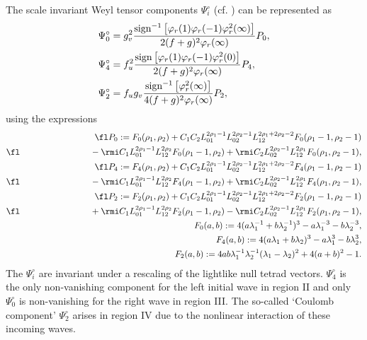 \documentclass[12pt]{iopart}
\begin{document}
The scale invariant Weyl tensor components $\Psi_i^{\circ}$ (cf. \cite{Griffiths1991}) can be represented as
\begin{eqnarray}
\Psi_0^{\circ}&=g_v^2\frac{{\rm sign}^{-1}\left[\varphi_r(1)\varphi_r(-1)\varphi_r^2(\infty)\right]}
   {2(f+g)^2\varphi_r(\infty)}P_0, \\
\Psi_4^{\circ}&=f_u^2\frac{{\rm sign}\left[\varphi_r(1)\varphi_r(-1)\varphi_r^2(0)\right]}
   {2(f+g)^2\varphi_r(\infty)}P_4, \\
\Psi_2^{\circ}&=f_ug_v\frac{{\rm sign}^{-1}\left[\varphi_r^2(\infty)\right]}
   {4(f+g)^2\varphi_r(\infty)}P_2,
\end{eqnarray}
using the expressions 
\begin{eqnarray}
\fl P_0:=F_0(\rho_1,\rho_2)+C_1 C_2 L_{01}^{2 \rho_1-1} L_{02}^{2 \rho_2-1} L_{12}^{2 \rho_1+2\rho_2-2} F_0(\rho_1-1,\rho_2-1)\\
\fl   \qquad\qquad\qquad\qquad -\rmi C_1 L_{01}^{2 \rho_1-1} L_{12}^{2
   \rho_2} F_0(\rho_1-1,\rho_2)+\rmi C_2 L_{02}^{2 \rho_2-1} L_{12}^{2
   \rho_1} F_0(\rho_1,\rho_2-1), \nonumber\\
\fl P_4:=F_4(\rho_1,\rho_2)+C_1 C_2 L_{01}^{2 \rho_1-1} L_{02}^{2 \rho_2-1} L_{12}^{2 \rho_1+2\rho_2-2} F_4(\rho_1-1,\rho_2-1)\\
\fl   \qquad\qquad\qquad\qquad -\rmi C_1 L_{01}^{2 \rho_1-1} L_{12}^{2
   \rho_2} F_4(\rho_1-1,\rho_2)+\rmi C_2 L_{02}^{2 \rho_2-1} L_{12}^{2
   \rho_1} F_4(\rho_1,\rho_2-1), \nonumber\\
\fl P_2:=F_2(\rho_1,\rho_2)+C_1 C_2 L_{01}^{2 \rho_1-1} L_{02}^{2 \rho_2-1} L_{12}^{2 \rho_1+2\rho_2-2} F_2(\rho_1-1,\rho_2-1)\\
\fl   \qquad\qquad\qquad\qquad +\rmi C_1 L_{01}^{2 \rho_1-1} L_{12}^{2
   \rho_2} F_2(\rho_1-1,\rho_2)-\rmi C_2 L_{02}^{2 \rho_2-1} L_{12}^{2
   \rho_1} F_2(\rho_1,\rho_2-1), \nonumber\\
F_0(a,b):=4(a\lambda_1^{-1}+b\lambda_2^{-1})^3-a\lambda_1^{-3}-b\lambda_2^{-3}, \\
F_4(a,b):=4(a\lambda_1+b\lambda_2)^3-a\lambda_1^{3}-b\lambda_2^{3}, \\
F_2(a,b):=4ab\lambda_1^{-1}\lambda_2^{-1}(\lambda_1-\lambda_2)^2+4(a+b)^2-1.
\end{eqnarray}
The $\Psi_i^{\circ}$ are invariant under a rescaling of the lightlike null tetrad vectors. $\Psi_4^{\circ}$ is the only non-vanishing component for the left initial wave in region II and only $\Psi_0^{\circ}$ is non-vanishing for the right wave in region III. The so-called `Coulomb component' $\Psi_2^{\circ}$ arises in region IV due to the nonlinear interaction of these incoming waves. 
\end{document}
